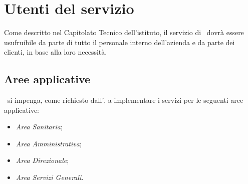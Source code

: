 	\newpage
	
	

\section{Utenti del servizio}\label{sec:utenti}

	Come descritto nel Capitolato Tecnico dell'istituto, il servizio di \helpdesk~dovrà essere usufruibile da parte di tutto il personale interno dell'azienda e da parte dei clienti, in base alla loro necessità.
	

	\subsection{Aree applicative}
	
		\azienda~si impenga, come richiesto dall'\istituto, a implementare i servizi per le seguenti aree applicative:
		\begin{itemize}[noitemsep]
			\item \textit{Area Sanitaria};
			\item \textit{Area Amministrativa};
			\item \textit{Area Direzionale};
			\item \textit{Area Servizi Generali}.
		\end{itemize}
	
